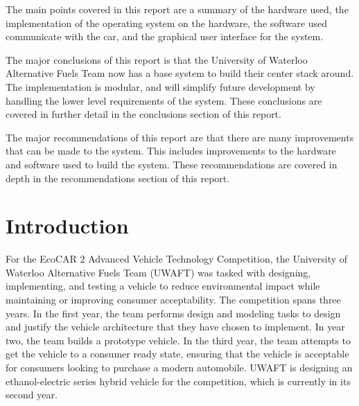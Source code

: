 \documentclass[ece]{uw-wkrpt}
\begin{document}
\begin{onehalfspacing}
The main points covered in this report are a summary of the hardware used, the
implementation of the operating system on the hardware, the software used
communicate with the car, and the graphical user interface for the system.

The major conclusions of this report is that the University of Waterloo
Alternative Fuels Team now has a base system to build their center stack around.
The implementation is modular, and will simplify future development by handling
the lower level requirements of the system. These conclusions are covered in
further detail in the conclusions section of this report.

The major recommendations of this report are that there are many improvements that
can be made to the system. This includes improvements to the hardware and
software used to build the system. These recommendations are covered in depth in
the recommendations section of this report.

\end{onehalfspacing}

\tableofcontents
\listoffigures
\listoftables

\mainmatter

\section{Introduction}\label{sec:intro}

For the EcoCAR 2 Advanced Vehicle Technology Competition, the University of
Waterloo Alternative Fuels Team (UWAFT) was tasked with designing, implementing,
and testing a vehicle to reduce environmental impact while maintaining or
improving consumer acceptability. The competition spans three years. In the
first year, the team performs design and modeling tasks to design and justify
the vehicle architecture that they have chosen to implement. In year two, the
team builds a prototype vehicle. In the third year, the team attempts to get the 
vehicle to a consumer ready state, ensuring that the vehicle is acceptable for
consumers looking to purchase a modern automobile. UWAFT is designing an
ethanol-electric series hybrid vehicle for the competition, which is currently
in its second year.
\end{document}
